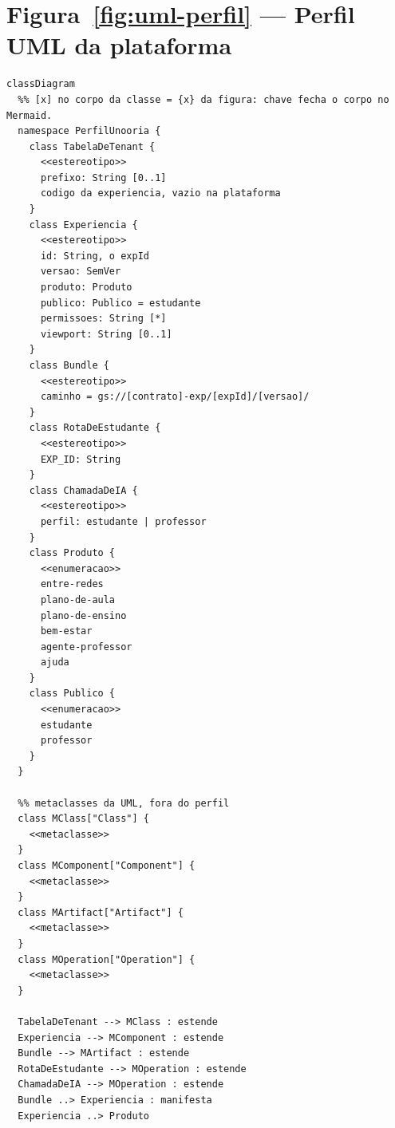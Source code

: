 \section{Figura~\ref{fig:uml-perfil} --- Perfil UML da plataforma}

\begin{lstlisting}[language=mermaid]
%% aproximacao: o Mermaid nao tem diagrama de perfil; a extensao de metaclasse (seta de ponta cheia) vira associacao rotulada "estende", e as restricoes entre chaves vao para notas.
classDiagram
  %% [x] no corpo da classe = {x} da figura: chave fecha o corpo no Mermaid.
  namespace PerfilUnooria {
    class TabelaDeTenant {
      <<estereotipo>>
      prefixo: String [0..1]
      codigo da experiencia, vazio na plataforma
    }
    class Experiencia {
      <<estereotipo>>
      id: String, o expId
      versao: SemVer
      produto: Produto
      publico: Publico = estudante
      permissoes: String [*]
      viewport: String [0..1]
    }
    class Bundle {
      <<estereotipo>>
      caminho = gs://[contrato]-exp/[expId]/[versao]/
    }
    class RotaDeEstudante {
      <<estereotipo>>
      EXP_ID: String
    }
    class ChamadaDeIA {
      <<estereotipo>>
      perfil: estudante | professor
    }
    class Produto {
      <<enumeracao>>
      entre-redes
      plano-de-aula
      plano-de-ensino
      bem-estar
      agente-professor
      ajuda
    }
    class Publico {
      <<enumeracao>>
      estudante
      professor
    }
  }

  %% metaclasses da UML, fora do perfil
  class MClass["Class"] {
    <<metaclasse>>
  }
  class MComponent["Component"] {
    <<metaclasse>>
  }
  class MArtifact["Artifact"] {
    <<metaclasse>>
  }
  class MOperation["Operation"] {
    <<metaclasse>>
  }

  TabelaDeTenant --> MClass : estende
  Experiencia --> MComponent : estende
  Bundle --> MArtifact : estende
  RotaDeEstudante --> MOperation : estende
  ChamadaDeIA --> MOperation : estende
  Bundle ..> Experiencia : manifesta
  Experiencia ..> Produto


\end{lstlisting}
